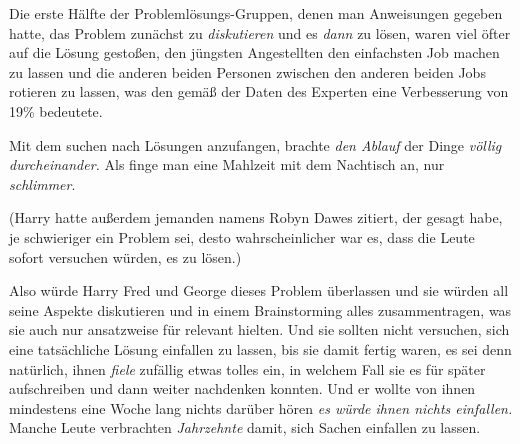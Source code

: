 Die erste Hälfte der Problemlösungs-Gruppen, denen man Anweisungen gegeben hatte, das Problem zunächst zu \emph{diskutieren} und es \emph{dann} zu lösen, waren viel öfter auf die Lösung gestoßen, den jüngsten Angestellten den einfachsten Job machen zu lassen und die anderen beiden Personen zwischen den anderen beiden Jobs rotieren zu lassen, was den gemäß der Daten des Experten eine Verbesserung von 19\% bedeutete.

Mit dem suchen nach Lösungen anzufangen, brachte \emph{den Ablauf} der Dinge \emph{völlig durcheinander.} Als finge man eine Mahlzeit mit dem Nachtisch an, nur \emph{schlimmer}.

(Harry hatte außerdem jemanden namens Robyn Dawes zitiert, der gesagt habe, je schwieriger ein Problem sei, desto wahrscheinlicher war es, dass die Leute sofort versuchen würden, es zu lösen.)

Also würde Harry Fred und George dieses Problem überlassen und sie würden all seine Aspekte diskutieren und in einem Brainstorming alles zusammentragen, was sie auch nur ansatzweise für relevant hielten. Und sie sollten nicht versuchen, sich eine tatsächliche Lösung einfallen zu lassen, bis sie damit fertig waren, es sei denn natürlich, ihnen \emph{fiele} zufällig etwas tolles ein, in welchem Fall sie es für später aufschreiben und dann weiter nachdenken konnten. Und er wollte von ihnen mindestens eine Woche lang nichts darüber hören \emph{es würde ihnen nichts einfallen.} Manche Leute verbrachten \emph{Jahrzehnte} damit, sich Sachen einfallen zu lassen.

